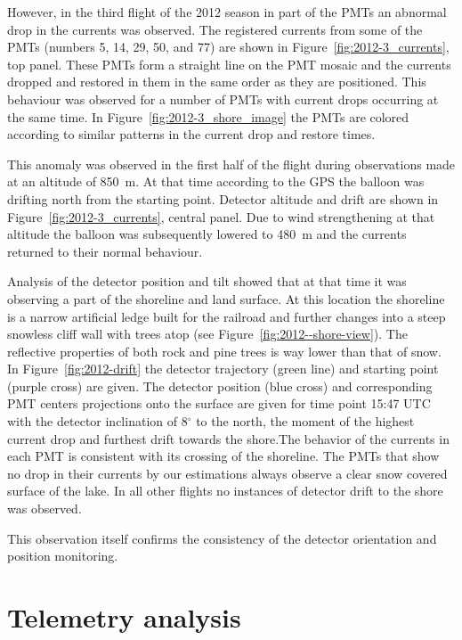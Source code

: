 \documentclass[universe,article,submit,moreauthors,pdftex]{Definitions/mdpi}
\begin{document}
\begin{paracol}{2}
However, in the third flight of the 2012 season in part of the PMTs an abnormal drop in the currents was observed. The registered currents from some of the PMTs (numbers 5, 14, 29, 50, and 77) are shown in Figure~\ref{fig:2012-3_currents}, top panel. These PMTs form a straight line on the PMT mosaic and the currents dropped and restored in them in the same order as they are positioned. This behaviour was observed for a number of PMTs with current drops occurring at the same time. In Figure~\ref{fig:2012-3_shore_image} the PMTs are colored according to similar patterns in the current drop and restore times.

This anomaly was observed in the first half of the flight during observations made at an altitude of 850~m. At that time according to the GPS the balloon was drifting north from the starting point. Detector altitude and drift are shown in Figure~\ref{fig:2012-3_currents}, central panel. Due to wind strengthening at that altitude the balloon was subsequently lowered to 480~m and the currents returned to their normal behaviour. 

Analysis of the detector position and tilt showed that at that time it was observing a part of the shoreline and land surface. At this location the shoreline is a narrow artificial ledge built for the railroad and further changes into a steep snowless cliff wall with trees atop (see Figure~\ref{fig:2012--shore-view}). The reflective properties of both rock and pine trees is way lower than that of snow. In Figure~\ref{fig:2012-drift} the detector trajectory (green line) and starting point (purple cross) are given. The detector position (blue cross) and corresponding PMT centers projections onto the surface are given for time point 15:47 UTC with the detector inclination of 8$^\circ$ to the north, the moment of the highest current drop and furthest drift towards the shore.The behavior of the currents in each PMT is consistent with its crossing of the shoreline. The PMTs that show no drop in their currents by our estimations always observe a clear snow covered surface of the lake. In all other flights no instances of detector drift to the shore was observed.

This observation itself confirms the consistency of the detector orientation and position monitoring.



\section{Telemetry analysis}


\end{paracol}
\end{document}
